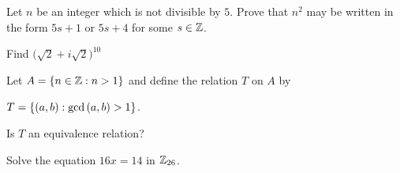 \documentclass[11pt]{exam}
\begin{document}
\begin{questions}
\question[4] Let $n$ be an integer which is not divisible by $5$.  Prove that $n^2$ may be written in the form $5s+1$ or $5s + 4$ for some $s\in\mathbb{Z}$.
\vfill

\question[3] Find $\big(\sqrt{2} + i\sqrt{2}\big)^{10}$
\vfill

\newpage

\question[3] Let $A = \left\{n\in\mathbb{Z} : n > 1\right\}$ and define the relation $T$ on $A$ by
\begin{center}
$T = \left\{(a,b):\text{gcd}\left(a,b\right) > 1\right\}$.
\end{center}
Is $T$ an equivalence relation?
\vfill

\question[4] Solve the equation $16x = 14$ in $\mathbb{Z}_{26}$.
\vfill

\end{questions}
\end{document}
